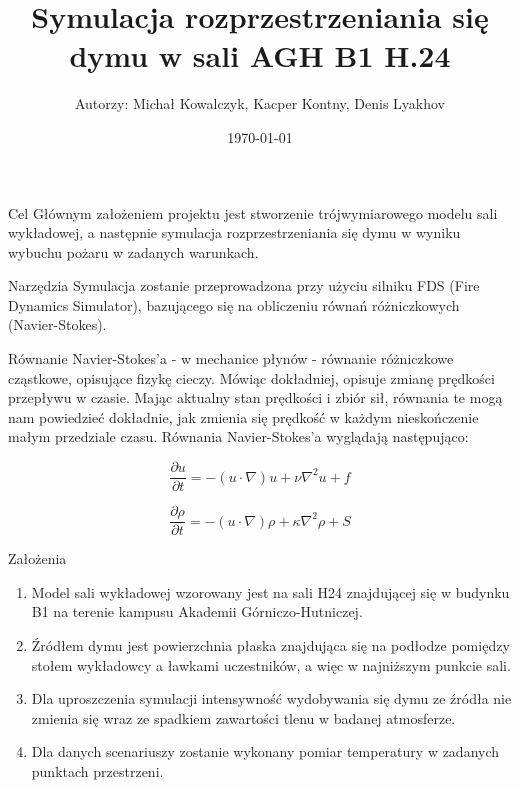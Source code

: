 \documentclass[a4paper, 12pt]{scrartcl}
\title{Symulacja rozprzestrzeniania się dymu w sali AGH B1 H.24}
\author{Autorzy: Michał Kowalczyk, Kacper Kontny, Denis Lyakhov}
\date{\today}
\begin{document}
	\maketitle
	
	\begin{section}{Cel}
		Głównym założeniem projektu jest stworzenie trójwymiarowego modelu sali wykładowej, a następnie symulacja rozprzestrzeniania się dymu w wyniku wybuchu pożaru w zadanych warunkach. 
	\end{section}
	
	\begin{section}{Narzędzia}
	Symulacja zostanie przeprowadzona przy użyciu silniku FDS (Fire Dynamics Simulator),
    bazującego się na obliczeniu równań różniczkowych (Navier-Stokes).
    
    \vspace{5mm}
    
    Równanie Navier-Stokes’a - w mechanice płynów - równanie różniczkowe cząstkowe,
    opisujące fizykę cieczy. Mówiąc dokładniej, opisuje zmianę prędkości przepływu w czasie.
    Mając aktualny stan prędkości i zbiór sił, równania te mogą nam powiedzieć dokładnie,
    jak zmienia się prędkość w każdym nieskończenie małym przedziale czasu.
    Równania Navier-Stokes’a wyglądają następująco:
    
    \begin{equation}
	    \frac{\partial u}{\partial t} = -(u \cdot \nabla)u+\nu\nabla^{2}u+f
	\end{equation}
	
	\begin{equation}
	    \frac{\partial \rho}{\partial t}=-(u\cdot\nabla)\rho+\kappa\nabla^{2}\rho + S
	\end{equation}

	\end{section}

	\begin{section}{Założenia}
		\begin{enumerate}
			\item Model sali wykładowej wzorowany jest na sali H24 znajdującej się w budynku B1 na terenie kampusu Akademii Górniczo-Hutniczej.
			\item Źródłem dymu jest powierzchnia płaska znajdująca się na podłodze pomiędzy stołem wykładowcy a ławkami uczestników, a więc w najniższym punkcie sali.
			\item Dla uproszczenia symulacji intensywność wydobywania się dymu ze źródła nie zmienia się wraz ze spadkiem zawartości tlenu w badanej atmosferze.
			\item Dla danych scenariuszy zostanie wykonany pomiar temperatury w zadanych punktach przestrzeni.
		\end{enumerate}
	\end{section}
\end{document}
